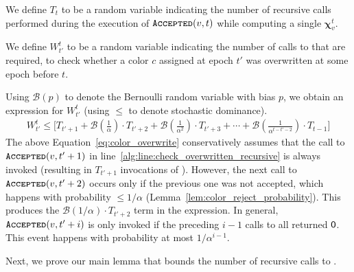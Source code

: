 \begin{definition}
\label{def:coloring_recursions}
We define $T_t$ to be a random variable indicating the number of recursive calls performed during the execution of $\texttt{\textsc{Accepted}}(v,t)$
while computing a single $\bm \chi_v^t$.
\end{definition}

\begin{definition}
\label{def:blah}
We define $W^t_{t'}$ to be a random variable indicating the number of calls to  that are required,
to check whether a color $c$ assigned at epoch $t'$ was overwritten at some epoch before $t$.
\end{definition}
Using $\mathcal B(p)$ to denote the Bernoulli random variable with bias $p$, we obtain an expression for $W^t_{t'}$
(using $\le$ to denote stochastic dominance).
\begin{align}
\label{eq:color_overwrite}
W^t_{t'} \le
\Biggl[T_{t'+1} + \mathcal B\left(\frac{1}{\alpha}\right)\cdot T_{t'+2}
+ \mathcal B\left(\frac{1}{\alpha^2}\right)\cdot T_{t'+3} + \cdots
+ \mathcal B\left(\frac{1}{\alpha^{t-t'-2}}\right)\cdot T_{t-1} \Biggr]
\end{align}
The above Equation~\ref{eq:color_overwrite} conservatively assumes that the call to $\texttt{\textsc{Accepted}}(v, t'+1)$
in line~\ref{alg:line:check_overwritten_recursive} is always invoked (resulting in $T_{t'+1}$ invocations of ).
However, the next call to $\texttt{\textsc{Accepted}}(v, t'+2)$ occurs only if the previous one was not accepted,
which happens with probability $\le 1/\alpha$ (Lemma~\ref{lem:color_reject_probability}).
This produces the $\mathcal B(1/\alpha)\cdot T_{t'+2}$ term in the expression.
In general, $\texttt{\textsc{Accepted}}(v, t'+i)$ is only invoked if the preceding $i-1$ calls to  all returned $\mathsf{0}$.
This event happens with probability at most $1/\alpha^{i-1}$.

Next, we prove our main lemma that bounds the number of recursive calls to .

